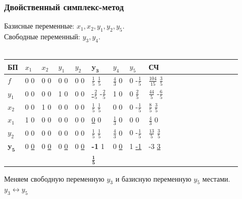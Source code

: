 \documentclass[14pt,a4paper,fleqn]{extarticle}
\begin{document}
	\subsubsection*{Двойственный симплекс-метод}
	Базисные переменные: $x_1, x_2, y_1, y_2, y_5$.\\
	Свободные переменный: $y_3, y_4$.\\\\
	\begin{tabularx}{\textwidth}{V{1}p{0.7cm}V{1}p{1.3cm}V{1}p{1.34cm}V{1}p{1.3cm}V{1}p{1.3cm}V{4}p{1.3cm}V{5}p{1.3cm}V{1}p{1.3cm}V{1}p{1.21cm}V{1}}
		\hline
		БП & $x_1$ & $x_2$ & $y_1$ & $y_2$ & $\boldsymbol{y_3}$ & $y_4$ & $y_5$ & СЧ\\
		\hline
		$f$ & 0 \footnotesize 0 & 0 \footnotesize 0 & 0 \footnotesize 0 & 0 \footnotesize 0 & \small \underline{$\frac{1}{5}$} \footnotesize $\frac{1}{5}$ & \small $\frac{4}{3}$ \footnotesize 0 & 0 \footnotesize -$\frac{1}{5}$& \small $\frac{104}{15}$ \footnotesize $\frac{3}{5}$\\
		\hline
		$y_1$ & 0 \footnotesize 0 & 0 \footnotesize 0 & 1 \footnotesize 0 & 0 \footnotesize 0 & \small \underline{-$\frac{2}{5}$} \footnotesize -$\frac{2}{5}$ & 1 \footnotesize 0 & 0 \footnotesize $\frac{2}{5}$ & \small $\frac{44}{5}$ \footnotesize -$\frac{6}{5}$\\
		\hline
		$x_2$ & 0 \footnotesize 0 & 1 \footnotesize 0 & 0 \footnotesize 0 & 0 \footnotesize 0 & \small \underline{$\frac{1}{5}$} \footnotesize $\frac{1}{5}$ & 0 \footnotesize 0 & 0 \footnotesize -$\frac{1}{5}$ & \small $\frac{8}{5}$ \footnotesize $\frac{3}{5}$\\
		\hline
		$x_1$ & 1 \footnotesize 0 & 0 \footnotesize 0 & 0 \footnotesize 0 & 0 \footnotesize 0 & \underline{0} \footnotesize 0 & \small $\frac{1}{3}$ \footnotesize 0 & 0 \footnotesize 0 & \small $\frac{4}{3}$ \footnotesize 0\\
		\hline
		$y_2$ & 0 \footnotesize 0 & 0 \footnotesize 0 & 0 \footnotesize 0 & 0 \footnotesize 0 & \small \underline{$\frac{1}{5}$} \footnotesize $\frac{1}{5}$ & \small $\frac{4}{3}$ \footnotesize 0 & 0 \footnotesize -$\frac{1}{5}$ & \small $\frac{13}{5}$ \footnotesize $\frac{3}{5}$\\
		\Xhline{5\arrayrulewidth}
		$\boldsymbol{y_5}$ & 0 \footnotesize \underline{0} & 0 \footnotesize \underline{0} & 0 \footnotesize \underline{0} & 0 \footnotesize \underline{0} & \textbf{-1} \footnotesize 1 & 0 \footnotesize \underline{0} & 1 \footnotesize \underline{-1} & \small -3 \footnotesize \underline{3}\\
		\Xhline{4\arrayrulewidth}
		& & & & & \small $\boldsymbol{\frac{1}{5}}$ & & &\\
	\end{tabularx}
	\newline\newline
	Меняем свободную переменную $y_3$ и базисную переменную $y_5$ местами.\\
	$y_3 \leftrightarrow y_5$
\end{document}
